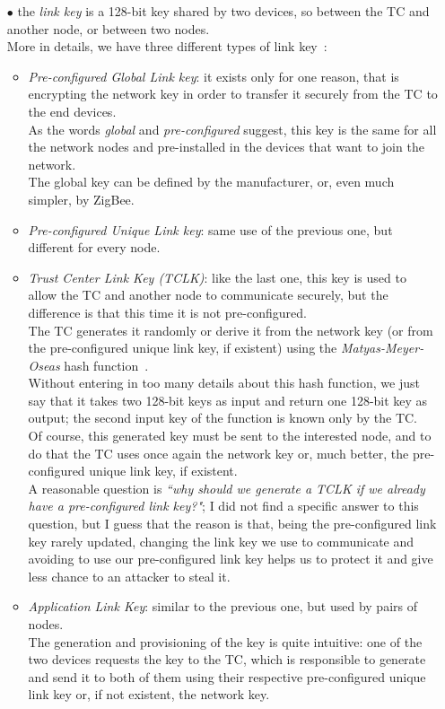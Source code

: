 \documentclass[12pt]{report}
\begin{document}
{\begin{itemize}
It is important to notice that joining devices can be also pre-configured with a network key, but this is a uncommon practice, since, as already said,  in a centralized model the network key is updated periodically by the TC.
\item[$\bullet$] the \emph{link key} is a 128-bit key shared by two devices, so between the TC and another node, or between two nodes.\\
More in details, we have three different types of link key~\cite{secanalysisofzigbee}:

\begin{itemize}
\item \emph{Pre-configured Global Link key}: it exists only for one reason, that is encrypting the network key in order to transfer it securely from the TC to the end devices.\\
As the words \emph{global} and \emph{pre-configured} suggest, this key is the same for all the network nodes and pre-installed in the devices that want to join the network.\\
The global key can be defined by the manufacturer, or, even much simpler, by ZigBee.
\item \emph{Pre-configured Unique Link key}: same use of the previous one, but different for every node.
\item \emph{Trust Center Link Key (TCLK)}: like the last one, this key is used to allow the TC and another node to communicate securely, but the difference is that this time it is not pre-configured.\\
The TC generates it randomly or derive it from the network key (or from the pre-configured unique link key, if existent) using the \emph{Matyas-Meyer-Oseas} hash function~\cite{onewaycompressionfunc}.\\ 
Without entering in too many details about this hash function, we just say that it takes two 128-bit keys as input and return one 128-bit key as output; the second input key of the function is known only by the TC.\\
Of course, this generated key must be sent to the interested node, and to do that the TC uses once again the network key or, much better, the pre-configured unique link key, if existent.\\

A reasonable question is \emph{``why should we generate a TCLK if we already have a pre-configured link key?"}; I did not find a specific answer to this question, but I guess that the reason is that, being the pre-configured link key rarely updated, changing the link key we use to communicate and avoiding to use our pre-configured link key helps us to protect it and give less chance to an attacker to steal it.
\item \emph{Application Link Key}: similar to the previous one, but used by pairs of nodes.\\
The generation and provisioning of the key is quite intuitive: one of the two devices requests the key to the TC, which is responsible to generate and send it to both of them using their respective pre-configured unique link key or, if not existent, the network key.
\end{itemize}


\end{itemize}}
\end{document}

